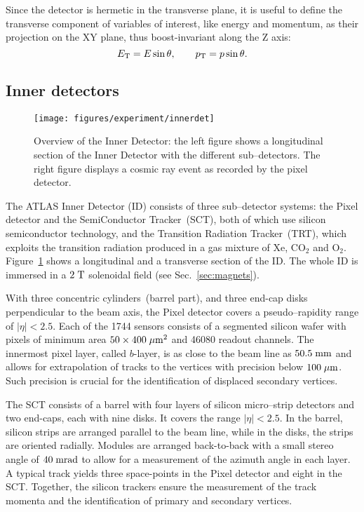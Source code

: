 Since the detector is hermetic in the transverse plane, it is useful
to define the transverse component of variables of interest,  
like energy and momentum, as their projection on the XY plane, thus
boost-invariant along the Z axis:
\begin{equation}\label{eq:transv}
\mbox{\ensuremath{E_{\mathrm{T}}}} = E\sin\theta, \qquad p_{\mathrm{T}} = p\sin\theta.
	\end{equation}

\subsection{Inner detectors}
\label{sec:ID}

\begin{figure}[ht]
\centering
\texttt{[image: figures/experiment/innerdet]}
\caption[Overview of the Inner Detector]{
  Overview of the Inner Detector: 
  the left figure shows a longitudinal section of the Inner Detector
  with the different sub--detectors.
  The right figure displays a cosmic ray event as recorded by the
  pixel detector.}
\label{fig:ID}
\end{figure}

The ATLAS Inner Detector (ID) consists of three sub--detector systems:
the Pixel detector and the SemiConductor Tracker~(SCT), both of which use
silicon semiconductor technology, and the Transition Radiation
Tracker~(TRT), which exploits the transition radiation produced in a
gas mixture of Xe, CO$_2$ and O$_2$.
Figure~\ref{fig:ID} shows a longitudinal and a transverse section of
the ID. The whole ID is immersed in a \mbox{$2 \; \mathrm{T}$} solenoidal field
(see Sec.~\ref{sec:magnets}).

With three concentric cylinders~(barrel part), and three end-cap disks
perpendicular to the beam axis, the Pixel detector covers a pseudo--rapidity range of
\mbox{$|\eta| < 2.5$}.
Each of the 1744 sensors consists of a segmented silicon wafer with
pixels of minimum area \mbox{$50 \times 400 \; \mu\mathrm{m}^2$} and 46080 readout
channels. The innermost pixel layer, called $b$-layer, is as close to
the beam line as \mbox{$50.5 \; \mathrm{mm}$} and allows for extrapolation of
tracks to the vertices with precision below \mbox{$100 \; \mu\mathrm{m}$}.
Such precision is crucial for the identification of displaced
secondary vertices.

The SCT consists of a barrel with four layers of silicon micro--strip
detectors and two end-caps, each with nine disks. It covers the range
\mbox{$|\eta| < 2.5$}. In the barrel, silicon strips are arranged
parallel to the beam line, while in the disks, the strips are oriented radially.
Modules are arranged back-to-back with a small stereo angle of
\mbox{$40 \; \mathrm{mrad}$} to allow for a measurement of the azimuth angle in
each layer. A typical track yields three space-points in the Pixel
detector and eight in the SCT. Together, the silicon trackers ensure
the measurement of the track momenta and the identification of primary
and secondary vertices. 

